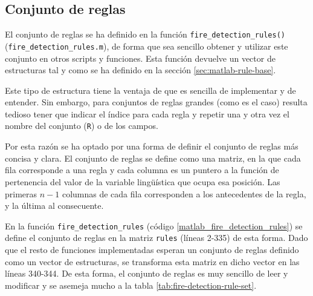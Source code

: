 







\subsection{Conjunto de reglas}

El conjunto de reglas se ha definido en la función \lstinline|fire_detection_rules()| (\lstinline|fire_detection_rules.m|), de forma que sea sencillo obtener y utilizar este conjunto en otros scripts y funciones. Esta función devuelve un vector de estructuras tal y como se ha definido en la sección \ref{sec:matlab-rule-base}.

Este tipo de estructura tiene la ventaja de que es sencilla de implementar y de entender. Sin embargo, para conjuntos de reglas grandes (como es el caso) resulta tedioso tener que indicar el índice para cada regla y repetir una y otra vez el nombre del conjunto (\lstinline|R|) o de los campos. 

Por esta razón se ha optado por una forma de definir el conjunto de reglas más concisa y clara. El conjunto de reglas se define como una matriz, en la que cada fila corresponde a una regla y cada columna es un puntero a la función de pertenencia del valor de la variable lingüística que ocupa esa posición. Las primeras $n-1$ columnas de cada fila corresponden a los antecedentes de la regla, y la última al consecuente.

En la función  \lstinline|fire_detection_rules| (código \ref{matlab_fire_detection_rules}) se define el conjunto de reglas en la matriz \lstinline|rules| (líneas 2-335) de esta forma. Dado que el resto de funciones implementadas esperan un conjunto de reglas definido como un vector de estructuras, se transforma esta matriz en dicho vector en las líneas 340-344. De esta forma, el conjunto de reglas es muy sencillo de leer y modificar y se asemeja mucho a la tabla \ref{tab:fire-detection-rule-set}.

\lstset{linewidth=18cm}

